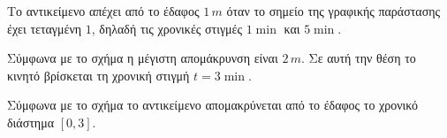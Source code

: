 \begin{alist}
\item Το αντικείμενο απέχει από το έδαφος $1 \, m$ όταν το σημείο της γραφικής παράστασης έχει τεταγμένη $1$, δηλαδή τις χρονικές στιγμές $1 \min$ και $5 \min$.
\item Σύμφωνα με το σχήμα η μέγιστη απομάκρυνση είναι $2 \, m$. Σε αυτή την θέση το κινητό βρίσκεται τη χρονική στιγμή $t = 3 \min$.
\item Σύμφωνα με το σχήμα το αντικείμενο απομακρύνεται από το έδαφος το χρονικό διάστημα $[0, 3]$.
\end{alist}

